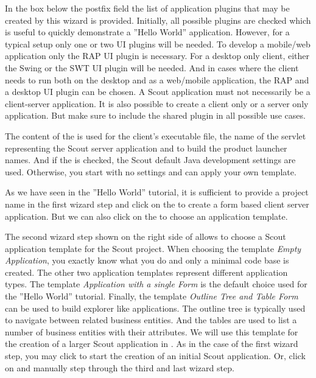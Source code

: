 \documentclass[a4paper,10pt,twoside]{book}
\begin{document}
In the box below the postfix field the list of application plugins that may be created by this wizard is provided. 
Initially, all possible plugins are checked which is useful to quickly demonstrate a ''Hello World'' application.
However, for a typical setup only one or two UI plugins will be needed. 
To develop a mobile/web application only the RAP UI plugin is necessary. 
For a desktop only client, either the Swing or the SWT UI plugin will be needed.
And in cases where the client needs to run both on the desktop and as a web/mobile application, the RAP and a desktop UI plugin can be chosen. 
A Scout application must not necessarily be a client-server application. 
It is also possible to create a client only or a server only application. 
But make sure to include the shared plugin in all possible use cases. 

The content of the  is used for the client's executable file, the name of the servlet representing the Scout server application and to build the product launcher names. 
And if the  is checked, the Scout default Java development settings are used. 
Otherwise, you start with no settings and can apply your own template. 

As we have seen in the ''Hello World'' tutorial, it is sufficient to provide a project name in the first wizard step and click on the  to create a form based client server application. 
But we can also click on the  to choose an application template.

The second wizard step shown on the right side of  allows to choose a Scout application template for the Scout project. 
When choosing the template \textit{Empty Application}, you exactly know what you do and only a minimal code base is created. 
The other two application templates represent different application types. 
The template \textit{Application with a single Form} is the default choice used for the ''Hello World'' tutorial.
Finally, the template \textit{Outline Tree and Table Form} can be used to build explorer like applications. 
The outline tree is typically used to navigate between related business entities. 
And the tables are used to list a number of business entities with their attributes. 
We will use this template for the creation of a larger Scout application in . 
As in the case of the first wizard step, you may click  to start the creation of an initial Scout application. 
Or, click on  and manually step through the third and last wizard step. 
\end{document}

